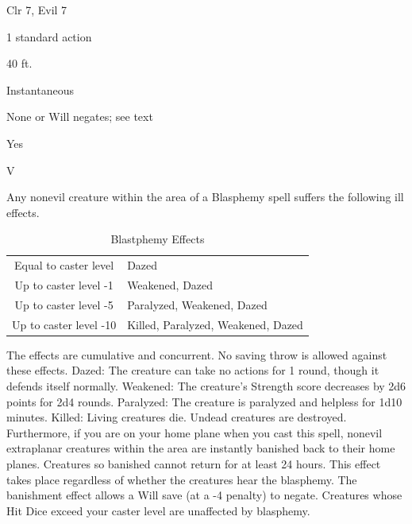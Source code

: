 
\begin{description*}
\item[Level:] Clr 7, Evil 7
\item[Casting Time:] 1 standard action
\item[Range:] 40 ft.
\item[Duration:] Instantaneous
\item[Saving Throw:] None or Will negates; see text
\item[Spell Resistance:] Yes
\item[Components:] V
\end{description*}

Any nonevil creature within the area of a Blasphemy spell suffers the
following ill effects.
\begin{table}[htb]
\caption{Blastphemy Effects}
\centering
\begin{tabular}{c l}
Equal to caster level & Dazed\\
Up to caster level -1 & Weakened, Dazed\\
Up to caster level -5 & Paralyzed, Weakened, Dazed\\
Up to caster level -10 & Killed, Paralyzed, Weakened, Dazed\\
\end{tabular}
\end{table}
The effects are cumulative and concurrent.
No saving throw is allowed against these effects.
Dazed: The creature can take no actions for 1 round, though it defends itself normally.
Weakened: The creature's Strength score decreases by 2d6 points for 2d4 rounds.
Paralyzed: The creature is paralyzed and helpless for 1d10 minutes.
Killed: Living creatures die. Undead creatures are destroyed.
Furthermore, if you are on your home plane when you cast this spell, nonevil extraplanar
creatures within the area are instantly banished back to their home planes. Creatures
so banished cannot return for at least 24 hours. This effect takes place regardless
of whether the creatures hear the blasphemy. The banishment effect allows
a Will save (at a -4 penalty) to negate.
Creatures whose Hit Dice exceed your caster level are unaffected by blasphemy.